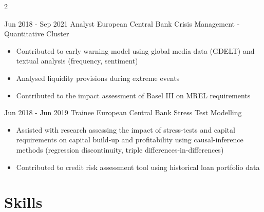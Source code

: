 \documentclass[
	10pt, %
]{FreemanCV}
\begin{document}
\begin{paracol}{2}




\jobentry
	{Jun 2018 - Sep 2021} %
	{Analyst} %
	{European Central Bank} %
	{Crisis Management - Quantitative Cluster \vspace{-1.5em}} %
	{\begin{itemize}[itemsep=-2pt]
		\item Contributed to early warning model using global media data (GDELT) and textual analysis (frequency, sentiment)
		\item Analysed liquidity provisions during extreme events
		\item Contributed to the impact assessment of Basel III on MREL requirements
	\end{itemize}} %

\jobentry
	{Jun 2018 - Jun 2019} %
	{Trainee} %
	{European Central Bank} %
	{Stress Test Modelling \vspace{-1.5em}} %
  	{\begin{itemize}[itemsep=-2pt]
    \item Assisted with research assessing the impact of stress-tests and capital requirements on capital build-up and profitability using causal-inference methods (regression discontinuity, triple differences-in-differences)
    \item Contributed to credit risk assessment tool using historical loan portfolio data
  \end{itemize}} %



\section{Skills} 


\end{paracol}
\end{document}
